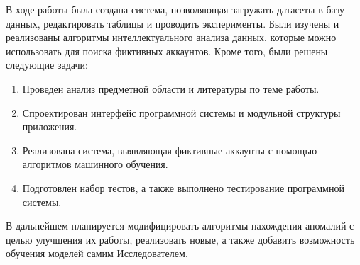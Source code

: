 \newpage
{}

В ходе работы была создана система, позволяющая загружать датасеты в базу данных, редактировать таблицы и проводить эксперименты. Были изучены и реализованы алгоритмы интеллектуального анализа данных, которые можно использовать для поиска фиктивных аккаунтов. Кроме того, были решены следующие задачи:

\begin{enumerate}[itemindent=2cm, leftmargin=0cm, labelsep=0.4cm, topsep=0cm, itemsep=0cm, parsep=0cm, label=\arabic*., after=\vspace{-0.1cm}, before=\vspace{-0.1cm}]
	\item Проведен анализ предметной области и литературы по теме работы.
	\item Спроектирован интерфейс программной системы и модульной структуры приложения.
	\item Реализована система, выявляющая фиктивные аккаунты с помощью алгоритмов машинного обучения.
        \item Подготовлен набор тестов, а также выполнено тестирование программной системы.
\end{enumerate}

В дальнейшем планируется модифицировать алгоритмы нахождения аномалий с целью улучшения их работы, реализовать новые, а также добавить возможность обучения моделей самим Исследователем. 